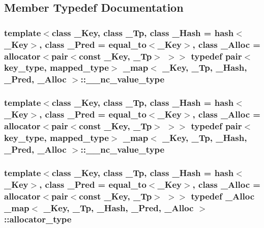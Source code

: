 \subsection{Member Typedef Documentation}
\hypertarget{class__map_acee1b994658827e62a6bdebca910a233}{}
\subsubsection[{\+\_\+\+\_\+nc\+\_\+value\+\_\+type}]{\setlength{\rightskip}{0pt plus 5cm}template$<$class \+\_\+\+Key, class \+\_\+\+Tp, class \+\_\+\+Hash = hash$<$\+\_\+\+Key$>$, class \+\_\+\+Pred = equal\+\_\+to$<$\+\_\+\+Key$>$, class \+\_\+\+Alloc = allocator$<$pair$<$const \+\_\+\+Key, \+\_\+\+Tp$>$ $>$$>$ typedef pair$<${\bf key\+\_\+type}, {\bf mapped\+\_\+type}$>$ {\bf \+\_\+map}$<$ \+\_\+\+Key, \+\_\+\+Tp, \+\_\+\+Hash, \+\_\+\+Pred, \+\_\+\+Alloc $>$\+::{\bf \+\_\+\+\_\+nc\+\_\+value\+\_\+type}}\label{class__map_acee1b994658827e62a6bdebca910a233}
\hypertarget{class__map_acee1b994658827e62a6bdebca910a233}{}
\subsubsection[{\+\_\+\+\_\+nc\+\_\+value\+\_\+type}]{\setlength{\rightskip}{0pt plus 5cm}template$<$class \+\_\+\+Key, class \+\_\+\+Tp, class \+\_\+\+Hash = hash$<$\+\_\+\+Key$>$, class \+\_\+\+Pred = equal\+\_\+to$<$\+\_\+\+Key$>$, class \+\_\+\+Alloc = allocator$<$pair$<$const \+\_\+\+Key, \+\_\+\+Tp$>$ $>$$>$ typedef pair$<${\bf key\+\_\+type}, {\bf mapped\+\_\+type}$>$ {\bf \+\_\+map}$<$ \+\_\+\+Key, \+\_\+\+Tp, \+\_\+\+Hash, \+\_\+\+Pred, \+\_\+\+Alloc $>$\+::{\bf \+\_\+\+\_\+nc\+\_\+value\+\_\+type}}\label{class__map_acee1b994658827e62a6bdebca910a233}
\hypertarget{class__map_ab38dd0bcf1867887afc2be61257ef025}{}
\subsubsection[{allocator\+\_\+type}]{\setlength{\rightskip}{0pt plus 5cm}template$<$class \+\_\+\+Key, class \+\_\+\+Tp, class \+\_\+\+Hash = hash$<$\+\_\+\+Key$>$, class \+\_\+\+Pred = equal\+\_\+to$<$\+\_\+\+Key$>$, class \+\_\+\+Alloc = allocator$<$pair$<$const \+\_\+\+Key, \+\_\+\+Tp$>$ $>$$>$ typedef \+\_\+\+Alloc {\bf \+\_\+map}$<$ \+\_\+\+Key, \+\_\+\+Tp, \+\_\+\+Hash, \+\_\+\+Pred, \+\_\+\+Alloc $>$\+::{\bf allocator\+\_\+type}}\label{class__map_ab38dd0bcf1867887afc2be61257ef025}
\hypertarget{class__map_ab38dd0bcf1867887afc2be61257ef025}{}
